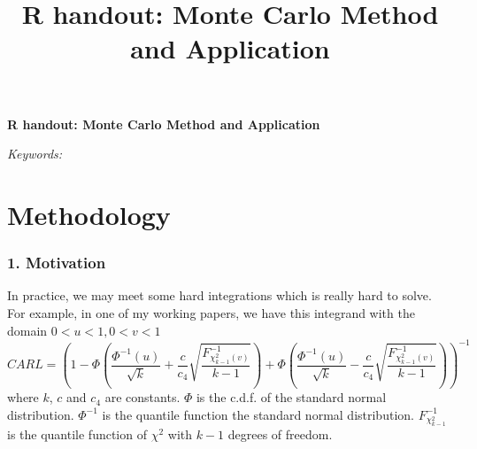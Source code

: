\documentclass[12pt]{article}
\newcommand{\blind}{}
\begin{document}
\def\spacingset#1{\renewcommand{\baselinestretch}%
{#1}\small\normalsize} \spacingset{1}



\blind
{
  \title{\bf R handout: Monte Carlo Method and Application}

  \author{
      }
  \maketitle
} \fi

\blind
{
  \bigskip
  \bigskip
  \bigskip
  \begin{center}
    {\LARGE\bf R handout: Monte Carlo Method and Application}
  \end{center}
  \medskip
} \fi

\bigskip
\begin{abstract}

\end{abstract}

\noindent%
{\it Keywords:} 
\vfill

\newpage
\spacingset{1.45} %

\hypertarget{methodology}{%
\section{Methodology}\label{methodology}}

\hypertarget{motivation}{%
\subsubsection{1. Motivation}\label{motivation}}

In practice, we may meet some hard integrations which is really hard to
solve. For example, in one of my working papers, we have this integrand
with the domain \(0<u<1, 0<v<1\) \begin{equation*}
            CARL = (1 - \Phi(\frac{\Phi^{-1}(u)}{\sqrt{k}} + \frac{c}{c_4}\sqrt{\frac{F^{-1}_{\chi^2_{k-1}(v)}}{k-1}}) + \Phi(\frac{\Phi^{-1}(u)}{\sqrt{k}} - \frac{c}{c_4}\sqrt{\frac{F^{-1}_{\chi^2_{k-1}(v)}}{k-1}}))^{-1}
        \end{equation*} where \(k\), \(c\) and \(c_4\) are constants.
\(\Phi\) is the c.d.f. of the standard normal distribution.
\(\Phi^{-1}\) is the quantile function the standard normal distribution.
\(F^{-1}_{\chi^2_{k-1}}\) is the quantile function of \(\chi^2\) with
\(k-1\) degrees of freedom.
\end{document}
